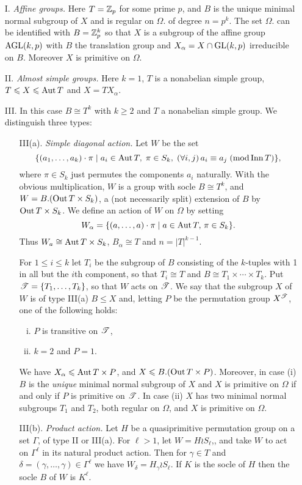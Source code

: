 \begin{enumerate}
\item[I.] 
\emph{Affine groups.} Here $T= \mathbb{Z}_p$ for some prime $p$, and $B$ is the unique minimal
normal subgroup of $X$ and is regular on $\Omega$. of degree $n = p^k$. The set $\Omega$. can be
identified with $B = \mathbb{Z}_p^k$ so that $X$ is a subgroup of the affine group $\operatorname{AGL}(k,p)$ with $B$
the translation group and $X_\alpha = X \cap \operatorname{GL}(k,p)$ irreducible on $B$. Moreover $X$ is
primitive on $\Omega$.
\item[II.] \emph{Almost simple groups.} Here $k = 1$, $T$ is a nonabelian simple group,
$T \leqslant X \leqslant \operatorname{Aut} T$ and $X = T X_\alpha$.
\item[III.] In this case $B \cong T^k$ with $k\geq 2$ and $T$ a nonabelian simple group. We
distinguish three types:
\begin{enumerate}
\item[III(a).] \emph{Simple diagonal action.} Let $W$ be the set
\[
    \{(a_1,\dots, a_k) \cdot \pi \mid a_i\in  \operatorname{Aut} T,\; \pi \in S_k, \;
(\forall i, j)\, a_i \equiv a_j \; (\mathrm{mod} \operatorname{Inn} T)\},\]
where $\pi \in S_k$ just permutes the components $a_i$ naturally. 
With the obvious multiplication, $W$ is a group with socle $B\cong T^k$, 
and $W = B . (\operatorname{Out} T\times S_k)$, a (not
necessarily split) extension of $B$ by $\operatorname{Out} T \times S_k$. 
We define an action of $W$ on $\Omega$ by setting
\[
W_\alpha = \{(a,\dots,a)\cdot \pi \mid a\in \operatorname{Aut} T, \, \pi \in S_k\}.
\]
Thus $W_a \cong \operatorname{Aut} T \times S_k$, $B_\alpha \cong T$ and $n = |T|^{k-1}$.

For $1 \leq  i \leq k$ let $T_i$ be the subgroup of $B$ consisting of the
$k$-tuples with 1 in all but the $i$th component, so that 
$T_i \cong T$ and $B \cong T_1 \times \cdots \times T_k$. Put $\mathscr{T} = \{T_1,
\dots, T_k\}$, so that $W$ acts on $\mathscr{T}$. 
We say that the subgroup $X$ of $W$ is of type III(a) $B\leq X$ and,
letting $P$ be the permutation group $X^{\mathscr{T}}$, one of the following holds:
\begin{enumerate}[(i)]
\item $P$ is transitive on $\mathscr{T}$,
\item $k = 2$ and $P= 1$.
\end{enumerate}
We have $X_\alpha\leqslant  \operatorname{Aut} T \times P$, and $X\leqslant B. (\operatorname{Out} T\times P)$. 
Moreover, in case (i) $B$ is the \emph{unique} minimal normal subgroup of $X$ and $X$ is
primitive on $\Omega$ if and only if $P$ is primitive on $\mathscr{T}$. 
In case (ii) $X$ has two minimal normal subgroups $T_1$ and $T_2$, both
regular on $\Omega$, and $X$ is primitive on $\Omega$.
\item[III(b).] \emph{Product action.} Let $H$ be a quasiprimitive permutation group on a set $\Gamma$,
  of type II or III(a). For $\ell > 1$, let $W = H \wr S_\ell$,, and take $W$ to
  act on $\Gamma^\ell$ in its natural product action. Then for
  $\gamma\in T$ and $\delta = (\gamma,\dots,\gamma)\in \Gamma^\ell$ we have
  $W_\delta = H_\gamma \wr S_\ell$.  If $K$ is the socle of $H$ then the socle
  $B$ of $W$ is $K^\ell$.


\end{enumerate}
\end{enumerate}
